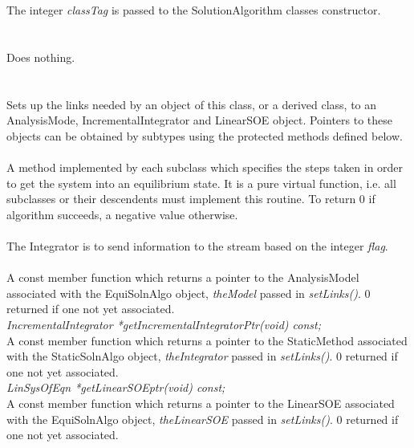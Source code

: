  \\ 
\\ 
The integer {\em classTag} is passed to the SolutionAlgorithm classes
constructor. \\

 \\
\\ 
Does nothing. \\


  \\
 \\
Sets up the links needed by an object of this class, or a derived
class, to an AnalysisMode, IncrementalIntegrator and LinearSOE
object. Pointers to these objects can be obtained by subtypes using
the protected methods defined below. \\ 

 \\
A method implemented by each subclass which specifies the steps taken
in order to get the system into an equilibrium state. It is a pure
virtual function, i.e. all subclasses or their descendents must
implement this routine. To return $0$ if algorithm succeeds, a negative
value otherwise. \\ 

\\
The Integrator is to send information to the stream based on the
integer {\em flag}. \\

 \\
A const member function which returns a pointer to the AnalysisModel
associated with the EquiSolnAlgo object, {\em theModel} passed in {\em
setLinks()}. $0$ returned if one not yet associated. \\

{\em IncrementalIntegrator *getIncrementalIntegratorPtr(void) const;} \\
A const member function which returns a pointer to the StaticMethod
associated with the StaticSolnAlgo object, {\em theIntegrator} passed
in {\em setLinks()}. $0$ returned if one not yet associated. \\
 
{\em LinSysOfEqn *getLinearSOEptr(void) const;} \\
A const member function which returns a pointer to the LinearSOE
associated with the EquiSolnAlgo object, {\em theLinearSOE} passed in
{\em setLinks()}. $0$ returned if one not yet associated. \\






